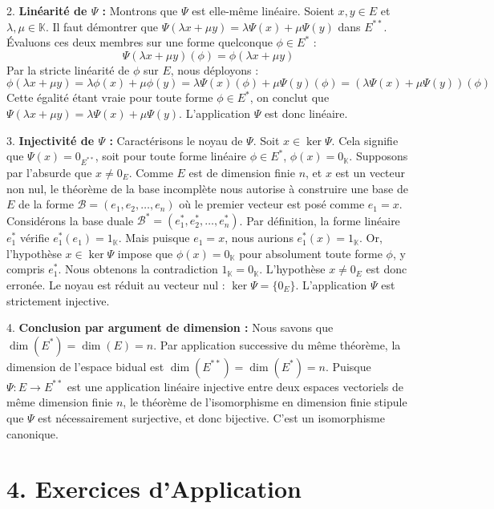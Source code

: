 \documentclass[11pt,a4paper]{report}
\begin{document}
2. \textbf{Linéarité de $\Psi$ :}
   Montrons que $\Psi$ est elle-même linéaire. Soient $x, y \in E$ et $\lambda, \mu \in \mathbb{K}$. Il faut démontrer que $\Psi(\lambda x + \mu y) = \lambda \Psi(x) + \mu \Psi(y)$ dans $E^{**}$.
   Évaluons ces deux membres sur une forme quelconque $\phi \in E^*$ :
   $$\Psi(\lambda x + \mu y)(\phi) = \phi(\lambda x + \mu y)$$
   Par la stricte linéarité de $\phi$ sur $E$, nous déployons :
   $$\phi(\lambda x + \mu y) = \lambda \phi(x) + \mu \phi(y) = \lambda \Psi(x)(\phi) + \mu \Psi(y)(\phi) = (\lambda \Psi(x) + \mu \Psi(y))(\phi)$$
   Cette égalité étant vraie pour toute forme $\phi \in E^*$, on conclut que $\Psi(\lambda x + \mu y) = \lambda \Psi(x) + \mu \Psi(y)$. L'application $\Psi$ est donc linéaire.

3. \textbf{Injectivité de $\Psi$ :}
   Caractérisons le noyau de $\Psi$. Soit $x \in \ker \Psi$. Cela signifie que $\Psi(x) = 0_{E^{**}}$, soit pour toute forme linéaire $\phi \in E^*$, $\phi(x) = 0_\mathbb{K}$.
   Supposons par l'absurde que $x \neq 0_E$. Comme $E$ est de dimension finie $n$, et $x$ est un vecteur non nul, le théorème de la base incomplète nous autorise à construire une base de $E$ de la forme $\mathcal{B} = (e_1, e_2, \dots, e_n)$ où le premier vecteur est posé comme $e_1 = x$.
   Considérons la base duale $\mathcal{B}^* = (e_1^*, e_2^*, \dots, e_n^*)$. Par définition, la forme linéaire $e_1^*$ vérifie $e_1^*(e_1) = 1_\mathbb{K}$.
   Mais puisque $e_1 = x$, nous aurions $e_1^*(x) = 1_\mathbb{K}$.
   Or, l'hypothèse $x \in \ker \Psi$ impose que $\phi(x) = 0_\mathbb{K}$ pour absolument toute forme $\phi$, y compris $e_1^*$. Nous obtenons la contradiction $1_\mathbb{K} = 0_\mathbb{K}$.
   L'hypothèse $x \neq 0_E$ est donc erronée. Le noyau est réduit au vecteur nul : $\ker \Psi = \{0_E\}$. L'application $\Psi$ est strictement injective.

4. \textbf{Conclusion par argument de dimension :}
   Nous savons que $\dim(E^*) = \dim(E) = n$. Par application successive du même théorème, la dimension de l'espace bidual est $\dim(E^{**}) = \dim(E^*) = n$.
   Puisque $\Psi : E \to E^{**}$ est une application linéaire injective entre deux espaces vectoriels de même dimension finie $n$, le théorème de l'isomorphisme en dimension finie stipule que $\Psi$ est nécessairement surjective, et donc bijective. C'est un isomorphisme canonique.

\section{4. Exercices d'Application}
\end{document}
